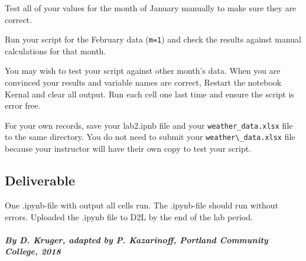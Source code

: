 \documentclass[11pt]{article}
\begin{document}
    Test all of your values for the month of January manually to make sure
they are correct.

Run your script for the February data (\texttt{m=1}) and check the
results against manual calculations for that month.

You may wish to test your script against other month's data. When you
are convinced your results and variable names are correct, Restart the
notebook Kernal and clear all output. Run each cell one last time and
ensure the script is error free.

For your own records, save your lab2.ipnb file and your
\texttt{weather\_data.xlsx} file to the same directory. You do not need
to submit your \texttt{weather\textbackslash{}\_data.xlsx} file because
your instructor will have their own copy to test your script.

    \hypertarget{deliverable}{%
\subsection{Deliverable}\label{deliverable}}

One .ipynb-file with output all cells run. The .ipynb-file should run
without errors. Uploaded the .ipynb file to D2L by the end of the lab
period.

    \hypertarget{by-d.-kruger-adapted-by-p.-kazarinoff-portland-community-college-2018}{%
\paragraph{\texorpdfstring{\emph{By D. Kruger, adapted by P. Kazarinoff,
Portland Community College,
2018}}{By D. Kruger, adapted by P. Kazarinoff, Portland Community College, 2018}}\label{by-d.-kruger-adapted-by-p.-kazarinoff-portland-community-college-2018}}


    
    
    
    
\end{document}
